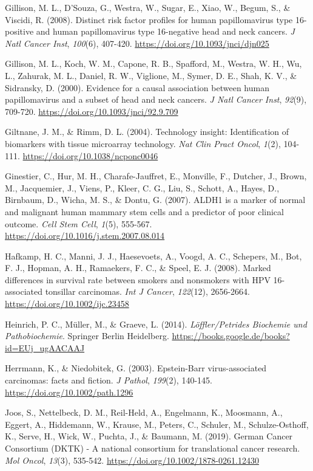 Gillison, M. L., D'Souza, G., Westra, W., Sugar, E., Xiao, W., Begum, S., \& Viscidi, R. (2008). Distinct risk factor profiles for human papillomavirus type 16-positive and human papillomavirus type 16-negative head and neck cancers. \emph{J Natl Cancer Inst}, \emph{100}(6), 407-420. \url{https://doi.org/10.1093/jnci/djn025}

Gillison, M. L., Koch, W. M., Capone, R. B., Spafford, M., Westra, W. H., Wu, L., Zahurak, M. L., Daniel, R. W., Viglione, M., Symer, D. E., Shah, K. V., \& Sidransky, D. (2000). Evidence for a causal association between human papillomavirus and a subset of head and neck cancers. \emph{J Natl Cancer Inst}, \emph{92}(9), 709-720. \url{https://doi.org/10.1093/jnci/92.9.709}

Giltnane, J. M., \& Rimm, D. L. (2004). Technology insight: Identification of biomarkers with tissue microarray technology. \emph{Nat Clin Pract Oncol}, \emph{1}(2), 104-111. \url{https://doi.org/10.1038/ncponc0046}

Ginestier, C., Hur, M. H., Charafe-Jauffret, E., Monville, F., Dutcher, J., Brown, M., Jacquemier, J., Viens, P., Kleer, C. G., Liu, S., Schott, A., Hayes, D., Birnbaum, D., Wicha, M. S., \& Dontu, G. (2007). ALDH1 is a marker of normal and malignant human mammary stem cells and a predictor of poor clinical outcome. \emph{Cell Stem Cell}, \emph{1}(5), 555-567. \url{https://doi.org/10.1016/j.stem.2007.08.014}

Hafkamp, H. C., Manni, J. J., Haesevoets, A., Voogd, A. C., Schepers, M., Bot, F. J., Hopman, A. H., Ramaekers, F. C., \& Speel, E. J. (2008). Marked differences in survival rate between smokers and nonsmokers with HPV 16-associated tonsillar carcinomas. \emph{Int J Cancer}, \emph{122}(12), 2656-2664. \url{https://doi.org/10.1002/ijc.23458}

Heinrich, P. C., Müller, M., \& Graeve, L. (2014). \emph{Löffler/Petrides Biochemie und Pathobiochemie}. Springer Berlin Heidelberg. \url{https://books.google.de/books?id=EUj_ugAACAAJ}

Herrmann, K., \& Niedobitek, G. (2003). Epstein-Barr virus-associated carcinomas: facts and fiction. \emph{J Pathol}, \emph{199}(2), 140-145. \url{https://doi.org/10.1002/path.1296}

Joos, S., Nettelbeck, D. M., Reil-Held, A., Engelmann, K., Moosmann, A., Eggert, A., Hiddemann, W., Krause, M., Peters, C., Schuler, M., Schulze-Osthoff, K., Serve, H., Wick, W., Puchta, J., \& Baumann, M. (2019). German Cancer Consortium (DKTK) - A national consortium for translational cancer research. \emph{Mol Oncol}, \emph{13}(3), 535-542. \url{https://doi.org/10.1002/1878-0261.12430}

